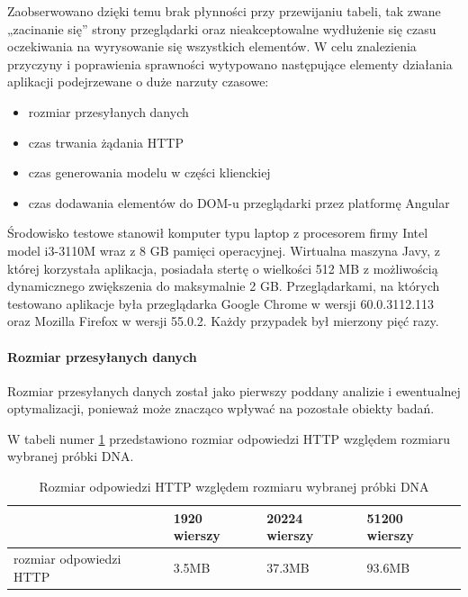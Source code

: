 \documentclass[a4paper,12pt,twoside]{article}
\begin{document}
Zaobserwowano dzięki temu brak płynności przy przewijaniu tabeli, tak zwane „zacinanie się” strony przeglądarki oraz nieakceptowalne wydłużenie się
czasu oczekiwania na wyrysowanie się wszystkich elementów.
W celu znalezienia przyczyny i poprawienia sprawności
wytypowano następujące elementy działania aplikacji podejrzewane o duże narzuty czasowe:

\begin{itemize}
\item rozmiar przesyłanych danych
\item czas trwania żądania HTTP
\item czas generowania modelu w części klienckiej
\item czas dodawania elementów do DOM-u przeglądarki przez platformę Angular
\end{itemize}

Środowisko testowe stanowił komputer typu laptop z
procesorem firmy Intel model i3-3110M wraz z 8 GB pamięci operacyjnej.
Wirtualna maszyna Javy, z której korzystała aplikacja, posiadała stertę
o wielkości 512 MB z możliwością dynamicznego zwiększenia do maksymalnie 2 GB.
Przeglądarkami, na których testowano aplikacje była przeglądarka
Google Chrome w wersji 60.0.3112.113 oraz Mozilla Firefox w wersji 55.0.2.
Każdy przypadek był mierzony pięć razy.
\newpage
\paragraph{Rozmiar przesyłanych danych}
Rozmiar przesyłanych danych został jako pierwszy poddany analizie i
ewentualnej optymalizacji, ponieważ może znacząco wpływać na pozostałe
obiekty badań.

W tabeli numer \ref{table:requestSizeNoOpt} przedstawiono rozmiar
odpowiedzi HTTP względem rozmiaru wybranej próbki DNA.

\begin{center}
\begin{table} [H]
\begin{tabular}{| p{4cm} | p{2.7cm} | p{2.7cm} | p{2.7cm}|}
\hline
& 1920 wierszy & 20224 wierszy & 51200 wierszy\\
\hline
rozmiar odpowiedzi HTTP& 3.5MB&37.3MB& 93.6MB\\ \hline
\end{tabular}

\caption{Rozmiar odpowiedzi HTTP względem rozmiaru wybranej próbki DNA}
\label{table:requestSizeNoOpt}
\end{table}
\end{center}
\end{document}
